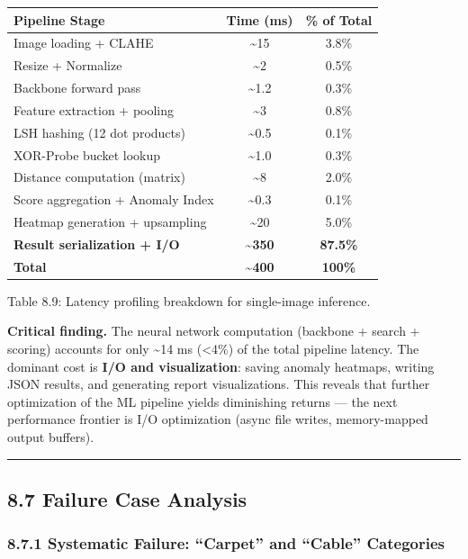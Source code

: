 \begin{longtable}[]{@{}lcc@{}}
\toprule\noalign{}
Pipeline Stage & Time (ms) & \% of Total \\
\midrule\noalign{}
\endhead
\bottomrule\noalign{}
\endlastfoot
Image loading + CLAHE & \textasciitilde15 & 3.8\% \\
Resize + Normalize & \textasciitilde2 & 0.5\% \\
Backbone forward pass & \textasciitilde1.2 & 0.3\% \\
Feature extraction + pooling & \textasciitilde3 & 0.8\% \\
LSH hashing (12 dot products) & \textasciitilde0.5 & 0.1\% \\
XOR-Probe bucket lookup & \textasciitilde1.0 & 0.3\% \\
Distance computation (matrix) & \textasciitilde8 & 2.0\% \\
Score aggregation + Anomaly Index & \textasciitilde0.3 & 0.1\% \\
Heatmap generation + upsampling & \textasciitilde20 & 5.0\% \\
\textbf{Result serialization + I/O} & \textbf{\textasciitilde350} & \textbf{87.5\%} \\
\textbf{Total} & \textbf{\textasciitilde400} & \textbf{100\%} \\
\end{longtable}

Table 8.9: Latency profiling breakdown for single-image inference.

\textbf{Critical finding.} The neural network computation (backbone + search + scoring) accounts for only \textasciitilde14 ms (\textless4\%) of the total pipeline latency. The dominant cost is \textbf{I/O and visualization}: saving anomaly heatmaps, writing JSON results, and generating report visualizations. This reveals that further optimization of the ML pipeline yields diminishing returns --- the next performance frontier is I/O optimization (async file writes, memory-mapped output buffers).

\begin{center}\rule{0.5\linewidth}{0.5pt}\end{center}

\subsection{8.7 Failure Case Analysis}\label{failure-case-analysis}

\subsubsection{8.7.1 Systematic Failure: ``Carpet'' and ``Cable'' Categories}\label{systematic-failure-carpet-and-cable-categories}

